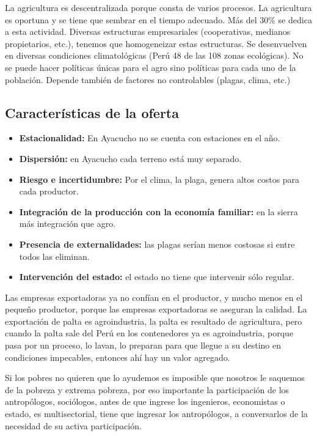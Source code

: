 \documentclass[
  letterpaper,
  DIV=11,
  numbers=noendperiod]{scrartcl}
\begin{document}
La agricultura es descentralizada porque consta de varios procesos. La
agricultura es oportuna y se tiene que sembrar en el tiempo adecuado.
Más del 30\% se dedica a esta actividad. Diversas estructuras
empresariales (cooperativas, medianos propietarios, etc.), tenemos que
homogeneizar estas estructuras. Se desenvuelven en diversas condiciones
climatológicas (Perú 48 de las 108 zonas ecológicas). No se puede hacer
políticas únicas para el agro sino políticas para cada uno de la
población. Depende también de factores no controlables (plagas, clima,
etc.)

\hypertarget{caracteruxedsticas-de-la-oferta}{%
\subsection{Características de la
oferta}\label{caracteruxedsticas-de-la-oferta}}

\begin{itemize}
\item
  \textbf{Estacionalidad:} En Ayacucho no se cuenta con estaciones en el
  año.
\item
  \textbf{Dispersión:} en Ayacucho cada terreno está muy separado.
\item
  \textbf{Riesgo e incertidumbre:} Por el clima, la plaga, genera altos
  costos para cada productor.
\item
  \textbf{Integración de la producción con la economía familiar:} en la
  sierra más integración que agro.
\item
  \textbf{Presencia de externalidades:} las plagas serían menos costosas
  si entre todos las eliminan.
\item
  \textbf{Intervención del estado:} el estado no tiene que intervenir
  sólo regular.
\end{itemize}

Las empresas exportadoras ya no confían en el productor, y mucho menos
en el pequeño productor, porque las empresas exportadoras se aseguran la
calidad. La exportación de palta es agroindustria, la palta es resultado
de agricultura, pero cuando la palta sale del Perú en los contenedores
ya es agroindustria, porque pasa por un proceso, lo lavan, lo preparan
para que llegue a su destino en condiciones impecables, entonces ahí hay
un valor agregado.

Si los pobres no quieren que lo ayudemos es imposible que nosotros le
saquemos de la pobreza y extrema pobreza, por eso importante la
participación de los antropólogos, sociólogos, antes de que ingrese los
ingenieros, economistas o estado, es multisectorial, tiene que ingresar
los antropólogos, a conversarlos de la necesidad de su activa
participación.
\end{document}

